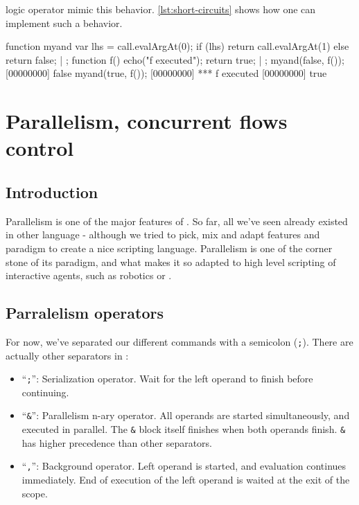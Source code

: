 \documentclass[openright,twoside,12pt]{report}
\begin{document}
\urbi logic operator mimic this behavior. \autoref{lst:short-circuits} shows
how one can implement such a behavior.

\begin{urbiscript}[caption=Implementing logic short circuits,
label=lst:short-circuits]
function myand
{
  var lhs = call.evalArgAt(0);
  if (lhs)
    return call.evalArgAt(1)
  else
    return false;
} | {};
function f()
{
  echo("f executed");
  return true;
} | {};
myand(false, f());
[00000000] false
myand(true, f());
[00000000] *** f executed
[00000000] true
\end{urbiscript}


\chapter{Parallelism, concurrent flows control}

\section{Introduction}

Parallelism is one of the major features of \urbi. So far, all we've
seen already existed in other language - although we tried to pick,
mix and adapt features and paradigm to create a nice scripting
language. Parallelism is one of the corner stone of its paradigm, and
what makes it so adapted to high level scripting of interactive
agents, such as robotics or \ai.

\section{Parralelism operators}

For now, we've separated our different commands with a semicolon
(\texttt{;}). There are actually other separators in \urbi:

\begin{itemize}
\item ``\texttt{;}'': Serialization operator. Wait for the left
  operand to finish before continuing.
\item ``\texttt{\&}'': Parallelism n-ary operator. All operands are
  started simultaneously, and executed in parallel. The \texttt{\&}
  block itself finishes when both operands finish. \texttt{\&} has
  higher precedence than other separators.
\item ``\texttt{,}'': Background operator. Left operand is started,
  and evaluation continues immediately. End of execution of the left
  operand is waited at the exit of the scope.
\end{itemize}
\end{document}
